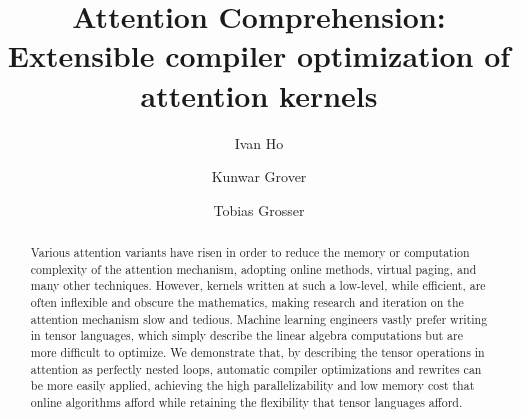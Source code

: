 \documentclass[review, anonymous, sigplan]{acmart}
\begin{document}
\title[BlockTendo]{Attention Comprehension: Extensible compiler optimization of attention kernels }       %


\author{Ivan Ho}

\author{Kunwar Grover}

\author{Tobias Grosser}

\begin{abstract}


  Various attention variants have risen in order to reduce the memory or computation complexity of the attention mechanism, adopting online methods, virtual paging, and many other techniques. However, kernels written at such a low-level, while efficient, are often inflexible and obscure the mathematics, making research and iteration on the attention mechanism slow and tedious. Machine learning engineers vastly prefer writing in tensor languages, which simply describe the linear algebra computations but are more difficult to optimize. We demonstrate that, by describing the tensor operations in attention as perfectly nested loops, automatic compiler optimizations and rewrites can be more easily applied, achieving the high parallelizability and low memory cost that online algorithms afford while retaining the flexibility that tensor languages afford.
\end{abstract}
\end{document}

